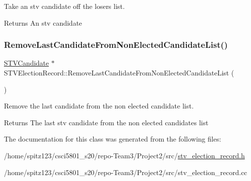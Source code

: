 Take an stv candidate off the losers list. 

\begin{DoxyReturn}{Returns}
An stv candidate 
\end{DoxyReturn}
\mbox{\label{classSTVElectionRecord_a741e5d955734ed07db8465cbaa3b0091}} 
\subsubsection{\texorpdfstring{Remove\+Last\+Candidate\+From\+Non\+Elected\+Candidate\+List()}{RemoveLastCandidateFromNonElectedCandidateList()}}
{\footnotesize\ttfamily \hyperlink{classSTVCandidate}{S\+T\+V\+Candidate} $\ast$ S\+T\+V\+Election\+Record\+::\+Remove\+Last\+Candidate\+From\+Non\+Elected\+Candidate\+List (\begin{DoxyParamCaption}{ }\end{DoxyParamCaption})}



Remove the last candidate from the non elected candidate list. 

\begin{DoxyReturn}{Returns}
The last stv candidate from the non elected candidates list 
\end{DoxyReturn}


The documentation for this class was generated from the following files\+:\begin{DoxyCompactItemize}
\item 
/home/spitz123/csci5801\+\_\+s20/repo-\/\+Team3/\+Project2/src/\hyperlink{stv__election__record_8h}{stv\+\_\+election\+\_\+record.\+h}\item 
/home/spitz123/csci5801\+\_\+s20/repo-\/\+Team3/\+Project2/src/stv\+\_\+election\+\_\+record.\+cc\end{DoxyCompactItemize}
